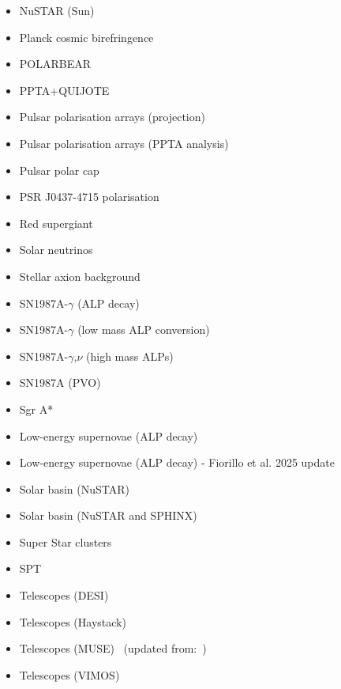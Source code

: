 \documentclass[8pt,twocolumn]{extarticle}
\begin{document}
\begin{mdframed}[everyline=true]
\begin{itemize}
    \item NuSTAR (Sun)~\cite{Ruz:2024gkl}
   	\item Planck cosmic birefringence~\cite{Fedderke:2019ajk}
   	\item POLARBEAR~\cite{POLARBEAR:2023ric,POLARBEAR:2024vel}
    \item PPTA+QUIJOTE~\cite{Castillo:2022zfl}
    \item Pulsar polarisation arrays (projection)~\cite{Liu:2021zlt}
     \item Pulsar polarisation arrays (PPTA analysis)~\cite{Xue:2024zjq}
    \item Pulsar polar cap~\cite{Noordhuis:2022ljw}
    \item PSR J0437-4715 polarisation~\cite{Caputo:2019tms}
    \item Red supergiant~\cite{Severino:2022nue}
    \item Solar neutrinos~\cite{Vinyoles2015}
    \item Stellar axion background~\cite{Nguyen:2023czp}
    \item SN1987A-$\gamma$ (ALP decay)~\cite{Jaeckel:2017tud,Hoof:2022xbe,Muller:2023vjm}
    \item SN1987A-$\gamma$ (low mass ALP conversion)~\cite{Payez:2014xsa,Hoof:2022xbe,Manzari:2024jns}
    \item SN1987A-$\gamma$,$\nu$ (high mass ALPs)~\cite{Lucente:2020whw,Caputo:2021rux,Caputo:2022mah}
    \item SN1987A (PVO)~\cite{Diamond:2023scc}
    \item Sgr A*~\cite{Yuan:2020xui}
    \item Low-energy supernovae (ALP decay)~\cite{Caputo:2022mah}
    \item Low-energy supernovae (ALP decay) - Fiorillo et al. 2025 update~\cite{Fiorillo:2025yzf}
    \item Solar basin (NuSTAR)~\cite{DeRocco:2022jyq}
    \item Solar basin (NuSTAR and SPHINX)~\cite{Beaufort:2023zuj}
    \item Super Star clusters~\cite{Dessert:2020lil}
    \item SPT~\cite{SPT-3G:2022ods}
    \item Telescopes (DESI)~\cite{Wang:2023imi}
    \item Telescopes (Haystack)~\cite{Blout:2000uc}
    \item Telescopes (MUSE)~\cite{Todarello:2023hdk} (updated from:~\cite{Regis:2020fhw})
    \item Telescopes (VIMOS)~\cite{Grin:2006aw}

\end{itemize}
\end{mdframed}
\end{document}
